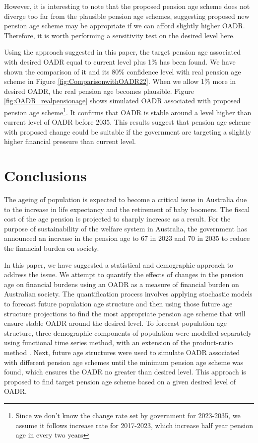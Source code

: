 \documentclass[11pt,a4paper,]{article}
\begin{document}
However, it is interesting to note that the proposed pension age scheme does not diverge too far from the plausible pension age schemes, suggesting proposed new pension age scheme may be appropriate if we can afford slightly higher OADR. Therefore, it is worth performing a sensitivity test on the desired level here.

Using the approach suggested in this paper, the target pension age associated with desired OADR equal to current level plus 1\% has been found. We have shown the comparison of it  and its 80\% confidence level with real pension age scheme in Figure \ref{fig:ComparisonwithOADR22}. When we allow 1\% more in desired OADR, the real pension age becomes plausible. Figure \ref{fig:OADR_realpensionage} shows simulated OADR associated with proposed pension age scheme\footnote{Since we don't know the change rate set by government for 2023-2035, we assume it follows increase rate for 2017-2023, which increase half year pension age in every two years}. It confirms that OADR is stable around a level higher than current level of OADR before 2035. This results suggest that pension age scheme with proposed change could be suitable if the government are targeting a slightly higher financial pressure than current level.

\hypertarget{sec:conclusions}{%
\section{Conclusions}\label{sec:conclusions}}

The ageing of population is expected to become a critical issue in Australia due to the increase in life expectancy and the retirement of baby boomers. The fiscal cost of the age pension is projected to sharply increase as a result. For the purpose of sustainability of the welfare system in Australia, the government has announced an increase in the pension age to 67 in 2023 and 70 in 2035 to reduce the financial burden on society.

In this paper, we have suggested a statistical and demographic approach to address the issue. We attempt to quantify the effects of changes in the pension age on financial burdens using an OADR as a measure of financial burden on Australian society. The quantification process involves applying stochastic models to forecast future population age structure and then using those future age structure projections to find the most appropriate pension age scheme that will ensure stable OADR around the desired level. To forecast population age structure, three demographic components of population were modelled separately using \textcite{HU07} functional time series method, with an extension of the product-ratio method \autocite{HBY13}. Next, future age structures were used to simulate OADR associated with different pension age schemes until the minimum pension age scheme was found, which ensures the OADR no greater than desired level. This approach is proposed to find target pension age scheme based on a given desired level of OADR.
\end{document}
